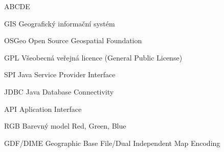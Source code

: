 
\begin{seznamzkratek}{ABCDE}

	      {GIS}
	      {Geografický informační systém}

	      {OSGeo}
	      {Open Source Geospatial Foundation}

	      {GPL}
	      {Všeobecná veřejná licence (General Public License)}
	      
	      {SPI}
	      {Java Service Provider Interface}
	      
	      {JDBC}
	      {Java Database Connectivity}
	      
	      {API}
	      {Aplication Interface}
	      
	      {RGB}
	      {Barevný model Red, Green, Blue}

	      {GDF/DIME}
	      {Geographic Base File/Dual Independent Map Encoding}
	      
	      

\end{seznamzkratek}